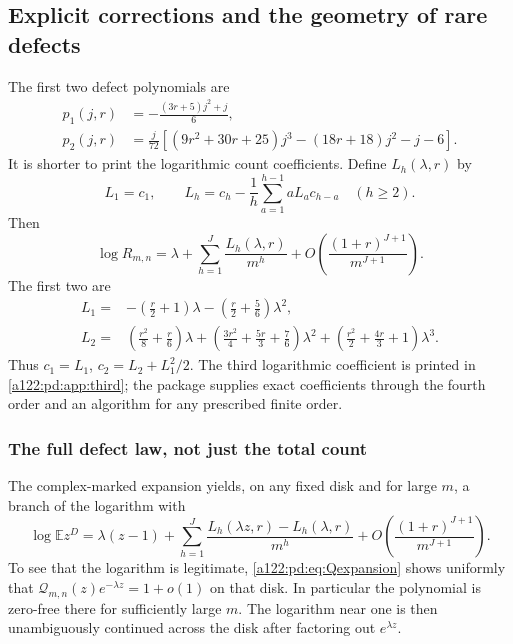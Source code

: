 \documentclass[11pt,letterpaper]{article}
\numberwithin{equation}{subsection}
\theoremstyle{definition}
\theoremstyle{remark}
\theoremstyle{plain}
\newcommand{\E}{\mathbb E}
\newcommand{\cQ}{\mathcal Q}
\begin{document}
\subsection{Explicit corrections and the geometry of rare defects}
\label{a122:pd:sec:corrections}
The first two defect polynomials are
\begin{align}
 p_1(j,r)&=-\frac{(3r+5)j^2+j}{6},\label{a122:pd:eq:p1}\\
 p_2(j,r)&=\frac{j}{72}\left[
 (9r^2+30r+25)j^3-(18r+18)j^2-j-6\right].\label{a122:pd:eq:p2}
\end{align}
It is shorter to print the logarithmic count coefficients. Define
$L_h(\lambda,r)$ by
\begin{equation}\label{a122:pd:eq:Lrec}
 L_1=c_1,\qquad
 L_h=c_h-\frac1h\sum_{a=1}^{h-1}aL_a c_{h-a}\quad(h\ge2).
\end{equation}
Then
\begin{equation}\label{a122:pd:eq:logexp}
 \log R_{m,n}=\lambda+\sum_{h=1}^J\frac{L_h(\lambda,r)}{m^h}
 +O\!\left(\frac{(1+r)^{J+1}}{m^{J+1}}\right).
\end{equation}
The first two are
\begin{align}
 L_1={}&-\left(\frac r2+1\right)\lambda
       -\left(\frac r2+\frac56\right)\lambda^2,\label{a122:pd:eq:L1}\\
 L_2={}&\left(\frac{r^2}{8}+\frac r6\right)\lambda
       +\left(\frac{3r^2}{4}+\frac{5r}{3}+\frac76\right)\lambda^2
       +\left(\frac{r^2}{2}+\frac{4r}{3}+1\right)\lambda^3.
       \label{a122:pd:eq:L2}
\end{align}
Thus $c_1=L_1$, $c_2=L_2+L_1^2/2$.
The third logarithmic coefficient is printed in \cref{a122:pd:app:third}; the
package supplies exact coefficients through the fourth order and an
algorithm for any prescribed finite order.

\subsubsection{The full defect law, not just the total count}
The complex-marked expansion yields, on any fixed disk and for large
$m$, a branch of the logarithm with
\begin{equation}\label{a122:pd:eq:pgflog}
 \log\E z^D=\lambda(z-1)+\sum_{h=1}^J
 \frac{L_h(\lambda z,r)-L_h(\lambda,r)}{m^h}
 +O\!\left(\frac{(1+r)^{J+1}}{m^{J+1}}\right).
\end{equation}
To see that the logarithm is legitimate, \eqref{a122:pd:eq:Qexpansion} shows
uniformly that $\cQ_{m,n}(z)e^{-\lambda z}=1+o(1)$ on that disk.
In particular the polynomial is zero-free there for sufficiently large
$m$. The logarithm near one is then unambiguously continued across the
disk after factoring out $e^{\lambda z}$.
\end{document}
